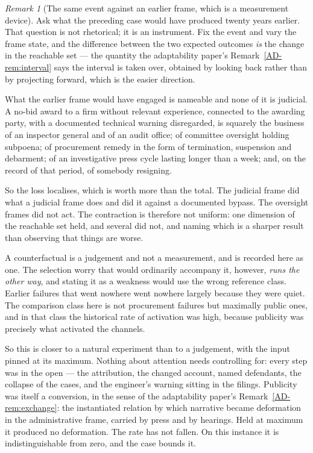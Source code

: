 \documentclass[11pt,a4paper]{article}
\theoremstyle{remark}
\newtheorem{remark}[definition]{Remark}
\begin{document}
\begin{remark}[The same event against an earlier frame, which is a measurement device]\label{rem:counterfactual}
Ask what the preceding case would have produced twenty years earlier. That question is not
rhetorical; it is an instrument. Fix the event and vary the frame state, and the difference between the
two expected outcomes \emph{is} the change in the reachable set --- the quantity
the adaptability paper's Remark~\ref{AD-rem:interval} says the interval is taken over, obtained by looking back rather than by
projecting forward, which is the easier direction.

What the earlier frame would have engaged is nameable and none of it is judicial. A no-bid award
to a firm without relevant experience, connected to the awarding party, with a documented technical
warning disregarded, is squarely the business of an inspector general and of an audit office; of
committee oversight holding subpoena; of procurement remedy in the form of termination, suspension and
debarment; of an investigative press cycle lasting longer than a week; and, on the record of that
period, of somebody resigning.

So the loss localises, which is worth more than the total. The judicial frame did what a judicial
frame does and did it against a documented bypass. The oversight frames did not act. The
contraction is therefore not uniform: one dimension of the reachable set held, and several did not, and
naming which is a sharper result than observing that things are worse.

A counterfactual is a judgement and not a measurement, and is recorded here as one. The selection
worry that would ordinarily accompany it, however, \emph{runs the other way}, and stating it as a
weakness would use the wrong reference class. Earlier failures that went nowhere went nowhere largely
because they were quiet. The comparison class here is not procurement failures but maximally
public ones, and in that class the historical rate of activation was high, because publicity was
precisely what activated the channels.

So this is closer to a natural experiment than to a judgement, with the input pinned at its
maximum. Nothing about attention needs controlling for: every step was in the open --- the attribution,
the changed account, named defendants, the collapse of the cases, and the engineer's warning sitting in
the filings. Publicity was itself a conversion, in the sense of the adaptability paper's Remark~\ref{AD-rem:exchange}: the
instantiated relation by which narrative became deformation in the administrative frame, carried by
press and by hearings. Held at maximum it produced no deformation. The rate has not fallen. On
this instance it is indistinguishable from zero, and the case bounds it.


\end{remark}
\end{document}
